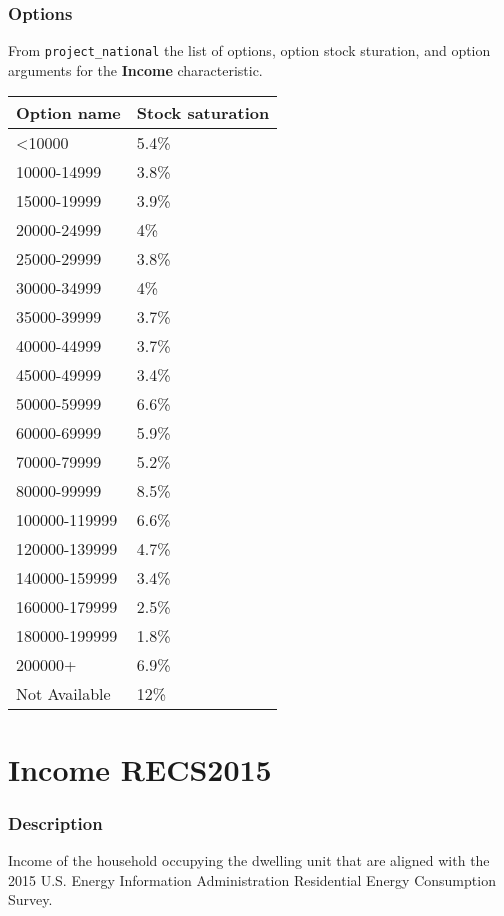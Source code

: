 \subsubsection{Options}\label{options-96}

From \texttt{project\_national} the list of options, option stock
sturation, and option arguments for the \textbf{Income} characteristic.

\begin{longtable}[]{@{}ll@{}}
\toprule\noalign{}
Option name & Stock saturation \\
\midrule\noalign{}
\endhead
\bottomrule\noalign{}
\endlastfoot
\textless10000 & 5.4\% \\
10000-14999 & 3.8\% \\
15000-19999 & 3.9\% \\
20000-24999 & 4\% \\
25000-29999 & 3.8\% \\
30000-34999 & 4\% \\
35000-39999 & 3.7\% \\
40000-44999 & 3.7\% \\
45000-49999 & 3.4\% \\
50000-59999 & 6.6\% \\
60000-69999 & 5.9\% \\
70000-79999 & 5.2\% \\
80000-99999 & 8.5\% \\
100000-119999 & 6.6\% \\
120000-139999 & 4.7\% \\
140000-159999 & 3.4\% \\
160000-179999 & 2.5\% \\
180000-199999 & 1.8\% \\
200000+ & 6.9\% \\
Not Available & 12\% \\
\end{longtable}

\section{Income RECS2015}\label{income_recs2015}

\subsubsection{Description}\label{description-97}

Income of the household occupying the dwelling unit that are aligned
with the 2015 U.S. Energy Information Administration Residential Energy
Consumption Survey.

